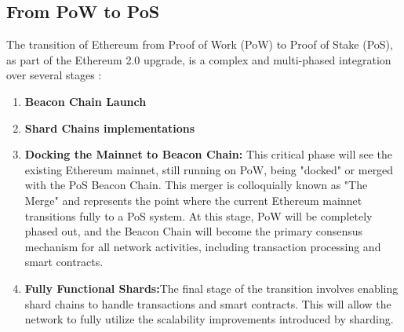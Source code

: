 \subsection{From PoW to PoS}

The transition of Ethereum from Proof of Work (PoW) to Proof of Stake (PoS), as part of the Ethereum 2.0 upgrade, is a complex and multi-phased integration over several stages :

\begin{enumerate}
    \item \textbf{Beacon Chain Launch}
    \item \textbf{Shard Chains implementations}
    \item \textbf{Docking the Mainnet to Beacon Chain:} This critical phase will see the existing Ethereum mainnet, still running on PoW, being "docked" or merged with the PoS Beacon Chain. This merger is colloquially known as "The Merge" and represents the point where the current Ethereum mainnet transitions fully to a PoS system. At this stage, PoW will be completely phased out, and the Beacon Chain will become the primary consensus mechanism for all network activities, including transaction processing and smart contracts.
    \item \textbf{Fully Functional Shards:}The final stage of the transition involves enabling shard chains to handle transactions and smart contracts. This will allow the network to fully utilize the scalability improvements introduced by sharding.
\end{enumerate} 